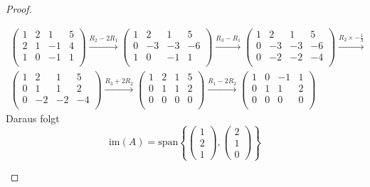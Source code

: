 \begin{proof}
	\begin{parts}
	\item 	\begin{align*}
		\left(
		\begin{array}{cccc}
			1 & 2 & 1 & 5 \\
			2 & 1 & -1 & 4 \\
			1 & 0 & -1 & 1 \\
		\end{array}
		\right) \xrightarrow{R_2-2R_1} \left(
		\begin{array}{cccc}
			1 & 2 & 1 & 5 \\
			0 & -3 & -3 & -6 \\
			1 & 0 & -1 & 1 \\
		\end{array}
		\right) \xrightarrow{R_3-R_1} \left(
		\begin{array}{cccc}
			1 & 2 & 1 & 5 \\
			0 & -3 & -3 & -6 \\
			0 & -2 & -2 & -4 \\
		\end{array}
		\right) \xrightarrow{R_2\times -\frac{1}{3}} \\\left(
		\begin{array}{cccc}
			1 & 2 & 1 & 5 \\
			0 & 1 & 1 & 2 \\
			0 & -2 & -2 & -4 \\
		\end{array}
		\right) \xrightarrow{R_3+2R_2} \left(
		\begin{array}{cccc}
			1 & 2 & 1 & 5 \\
			0 & 1 & 1 & 2 \\
			0 & 0 & 0 & 0 \\
		\end{array}
		\right) \xrightarrow{R_1-2R_2} \left(
		\begin{array}{cccc}
			1 & 0 & -1 & 1 \\
			0 & 1 & 1 & 2 \\
			0 & 0 & 0 & 0 \\
		\end{array}
		\right)
	\end{align*}
	Daraus folgt
	\[
	\text{im}(A)=\text{span}\left\{ \begin{pmatrix} 1 \\ 2 \\ 1 \end{pmatrix} , \begin{pmatrix} 2 \\ 1 \\ 0 \end{pmatrix}  \right\} 
\]
\end{parts}
\end{proof}
